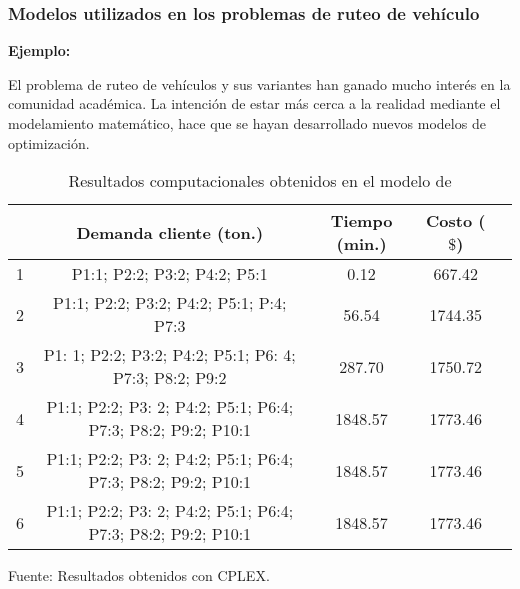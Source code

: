 \subsubsection{Modelos utilizados en los problemas de ruteo de vehículo }

{\bf Ejemplo:}\par

El problema de ruteo de vehículos \citep{Ombuki, Yeun} y sus variantes han ganado mucho interés en la comunidad académica. La intención de estar más cerca a la realidad mediante el modelamiento matemático, hace que se hayan desarrollado nuevos modelos de optimización. \par
\vskip 0.2cm

\begin{table}[h!]
\begin{center}
\caption{\small{Resultados computacionales obtenidos en el modelo de \cite{Ombuki}}}
\end{center}
\vskip -0.7cm
\begin{tabular}{|c|c|c|c|c|}
\hline 
\rowcolor{LightBlue2}{\small Escenarios} & {\small Demanda cliente (ton.)} & {\small Tiempo (min.)} & {\small Costo ($\$$)} \\ 
\hline 
{\small 1} & {\small P1:1; P2:2; P3:2; P4:2; P5:1} & {\small 0.12} & {\small 667.42} \\ 
\hline 
{\small 2} & {\small P1:1; P2:2; P3:2; P4:2; P5:1; P:4; P7:3} & {\small 56.54} & {\small 1744.35} \\ 
\hline 
{\small 3} & {\small P1: 1; P2:2; P3:2; P4:2; P5:1; P6: 4; P7:3; P8:2; P9:2} & {\small 287.70} & {\small 1750.72} \\ 
\hline 
{\small 4} & {\small P1:1; P2:2; P3: 2; P4:2; P5:1; P6:4; P7:3; P8:2; P9:2; P10:1} & {\small 1848.57} & {\small 1773.46} \\ 
\hline 
{\small 5} & {\small P1:1; P2:2; P3: 2; P4:2; P5:1; P6:4; P7:3; P8:2; P9:2; P10:1} & {\small 1848.57} & {\small 1773.46} \\ 
\hline 
{\small 6} & {\small P1:1; P2:2; P3: 2; P4:2; P5:1; P6:4; P7:3; P8:2; P9:2; P10:1} & {\small 1848.57} & {\small 1773.46} \\ 
\hline 
\end{tabular} 
\begin{center}
\vskip -0.2cm
{\small{Fuente: Resultados obtenidos con CPLEX.}}
\end{center}
\end{table}



